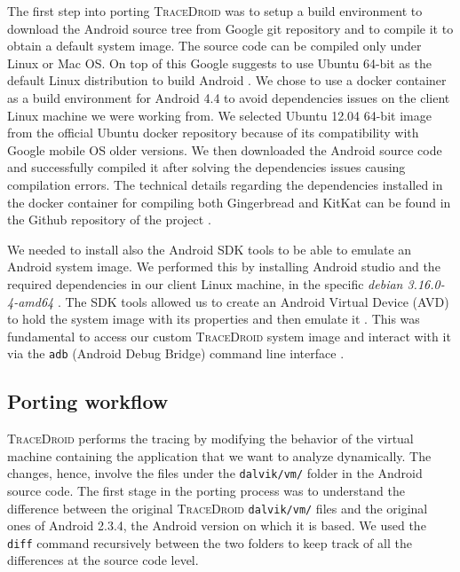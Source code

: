 The first step into porting \textsc{TraceDroid} was to setup a build
environment to download the Android source tree from Google git
repository and to compile it to obtain a default system image. The
source code can be compiled only under Linux or Mac OS. On top of this
Google suggests to use Ubuntu 64-bit as the default Linux distribution
to build Android \cite{ref18}. We chose to use a docker container as a build
environment for Android 4.4 to avoid dependencies issues on the client
Linux machine we were working from. We selected Ubuntu 12.04 64-bit
image from the official Ubuntu docker repository because of its
compatibility with Google mobile OS older versions. We then
downloaded the Android source code \cite{ref19} and successfully compiled it after
solving the dependencies issues causing compilation errors. The
technical details regarding the dependencies installed in the docker
container for compiling both Gingerbread and KitKat can be found in
the Github repository of the project \cite{ref15}.

We needed to install also the Android SDK tools \cite{ref21} to be able to emulate
an Android system image. We performed this by installing Android
studio and the required dependencies in our client Linux machine, in
the specific \textit{debian 3.16.0-4-amd64} \cite{ref20}. The SDK tools allowed
us to create an Android Virtual Device (AVD) to hold the system image
with its properties and then emulate it \cite{ref15}. This was fundamental to
access our custom \textsc{TraceDroid} system image and interact with
it via the \texttt{adb} (Android Debug Bridge) command line interface
\cite{ref22}.

\subsection{Porting workflow}
\label{sec:porting_workflow}

\textsc{TraceDroid} \cite{ref1} performs the tracing by modifying the behavior of the
virtual machine containing the application that we want to analyze
dynamically. The changes, hence, involve the files under the
\texttt{dalvik/vm/} folder in the Android source code. The first stage in the
porting process was to understand the difference between the original
\textsc{TraceDroid} \texttt{dalvik/vm/} files and the original ones of Android 2.3.4,
the Android version on which it is based. We used the \texttt{diff} command
recursively between the two folders to keep track of all the
differences at the source code level.

